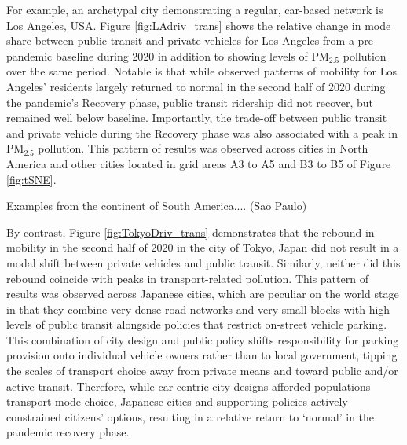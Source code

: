 \documentclass[preprint,12pt]{elsarticle}
\begin{document}
For example, an archetypal city demonstrating a regular, car-based network is Los Angeles, USA. Figure \ref{fig:LAdriv_trans} shows the relative change in mode share between public transit and private vehicles for Los Angeles from a pre-pandemic baseline during 2020 in addition to showing levels of PM$_{2.5}$ pollution over the same period. Notable is that while observed patterns of mobility for Los Angeles' residents largely returned to normal in the second half of 2020 during the pandemic's Recovery phase, public transit ridership did not recover, but remained well below baseline. Importantly, the trade-off between public transit and private vehicle during the Recovery phase was also associated with a peak in PM$_{2.5}$ pollution. This pattern of results was observed across cities in North America and other cities located in grid areas A3 to A5 and B3 to B5 of Figure \ref{fig:tSNE}.

Examples from the continent of South America.... (Sao Paulo)

By contrast, Figure \ref{fig:TokyoDriv_trans} demonstrates that the rebound in mobility in the second half of 2020 in the city of Tokyo, Japan did not result in a modal shift between private vehicles and public transit. Similarly, neither did this rebound coincide with peaks in transport-related pollution. This pattern of results was observed across Japanese cities, which are peculiar on the world stage in that they combine very dense road networks and very small blocks with high levels of public transit alongside policies that restrict on-street vehicle parking\cite{clements2019socialising}. This combination of city design and public policy shifts responsibility for parking provision onto individual vehicle owners rather than to local government, tipping the scales of transport choice away from private means and toward public and/or active transit. Therefore, while car-centric city designs afforded populations transport mode choice, Japanese cities and supporting policies actively constrained citizens' options, resulting in a relative return to `normal' in the pandemic recovery phase.
\end{document}

